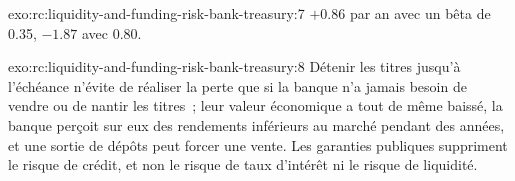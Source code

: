 \begin{solution}{exo:rc:liquidity-and-funding-risk-bank-treasury:7}
$+0.86$ par an avec un bêta de 0.35, $-1.87$ avec 0.80.
\end{solution}

\begin{solution}{exo:rc:liquidity-and-funding-risk-bank-treasury:8}
Détenir les titres jusqu'à l'échéance n'évite de réaliser la perte que si la banque n'a jamais besoin de vendre ou de nantir les
titres~; leur valeur économique a tout de même baissé, la banque perçoit sur eux des rendements inférieurs au marché
pendant des années, et une sortie de dépôts peut forcer une vente. Les garanties publiques suppriment le risque de crédit, et non
le risque de taux d'intérêt ni le risque de liquidité.
\end{solution}

